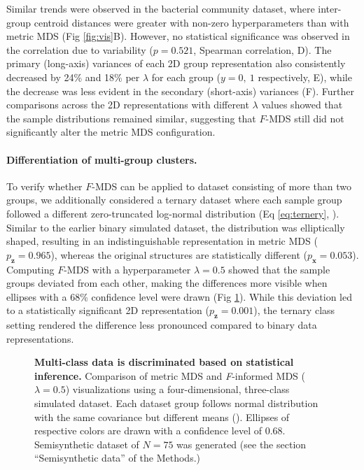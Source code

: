\documentclass[10pt,letterpaper]{article}
\newcommand{\1}{{\rm 1}\kern-0.24em{\rm I}}
\begin{document}
Similar trends were observed in the bacterial community dataset, where inter-group centroid distances were greater with non-zero hyperparameters than with metric MDS (Fig \ref{fig:vis}B). However, no statistical significance was observed in the correlation due to variability ($p = 0.521$, Spearman correlation, D). The primary (long-axis) variances of each 2D group representation also consistently decreased by 24\% and 18\% per $\lambda$ for each group ($y=0,\ 1$ respectively, E), while the decrease was less evident in the secondary (short-axis) variances (F). Further comparisons across the 2D representations with different $\lambda$ values showed that the sample distributions remained similar, suggesting that $F$-MDS still did not significantly alter the metric MDS configuration.


\paragraph*{Differentiation of multi-group clusters.} To verify whether $F$-MDS can be applied to dataset consisting of more than two groups, we additionally considered a ternary dataset where each sample group followed a different zero-truncated log-normal distribution (Eq \ref{eq:ternery}, ). Similar to the earlier binary simulated dataset, the distribution was elliptically shaped, resulting in an indistinguishable representation in metric MDS ($p_\mathbf{z}=0.965$), whereas the original structures are statistically different ($p_\mathbf{x}=0.053$). Computing $F$-MDS with a hyperparameter $\lambda=0.5$ showed that the sample groups deviated from each other, making the differences more visible when ellipses with a 68\% confidence level were drawn (Fig \ref{fig:vis_multiclass}). While this deviation led to a statistically significant 2D representation ($p_\mathbf{z}=0.001$), the ternary class setting rendered the difference less pronounced compared to binary data representations.


\begin{figure}[h!]
    \centering
    \caption{\textbf{Multi-class data is discriminated based on statistical inference.} Comparison of metric MDS and \textit{F}-informed MDS ($\lambda=0.5$) visualizations using a four-dimensional, three-class simulated dataset. Each dataset group follows normal distribution with the same covariance but different means (). Ellipses of respective colors are drawn with a confidence level of 0.68. Semisynthetic dataset of $N=75$ was generated (see the section ``Semisynthetic data'' of the Methods.)}
    \label{fig:vis_multiclass}
\end{figure}
\end{document}
